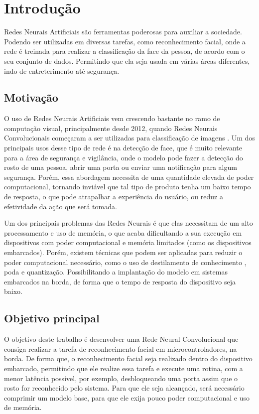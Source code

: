 \chapter{Introdução}

Redes Neurais Artificiais são ferramentas poderosas para auxiliar a sociedade.
Podendo ser utilizadas em diversas tarefas, como reconhecimento facial, onde a rede é treinada para realizar a
classificação da face da pessoa, de acordo com o seu conjunto de dados.
Permitindo que ela seja usada em várias áreas diferentes, indo de entreterimento até segurança.


\section{Motivação}
O uso de Redes Neurais Artificiais vem crescendo bastante no ramo de computação visual, principalmente desde 2012,
quando Redes Neurais Convolucionais começaram a ser utilizadas para classificação de imagens \cite{alexnet}.
Um dos principais usos desse tipo de rede é na detecção de face, que é muito relevante para a área de segurança e
vigilância, onde o modelo pode fazer a detecção do rosto de uma pessoa, abrir uma porta ou enviar uma notificação
para algum segurança. Porém, essa abordagem necessita de uma quantidade elevada de poder computacional, tornando
inviável que tal tipo de produto tenha um baixo tempo de resposta, o que pode atrapalhar a experiência do usuário, ou
reduz a efetividade da ação que será tomada.

Um dos principais problemas das Redes Neurais é que elas necessitam de um alto processamento e uso de memória, o que
acaba dificultando a sua execução em dispositivos com poder computacional e memória limitados (como os dispositivos
embarcados).
Porém, existem técnicas que podem ser aplicadas para reduzir o poder computacional necessário, como o uso de
destilamento de conhecimento \cite{hinton2015distilling}, poda e quantização.
Possibilitando a implantação do modelo em sistemas embarcados na borda, de forma que o tempo de resposta do dispositivo
seja baixo.

\section{Objetivo principal}

O objetivo deste trabalho é desenvolver uma Rede Neural Convolucional que consiga realizar a tarefa de reconhecimento
facial em microcontroladores, na borda.
De forma que, o reconhecimento facial seja realizado dentro do dispositivo embarcado, permitindo que ele realize essa
tarefa e execute uma rotina, com a menor latência possível, por exemplo, desbloqueando uma porta assim que o rosto for
reconhecido pelo sistema.
Para que ele seja alcançado, será necessário comprimir um modelo base, para que ele exija pouco poder computacional
e uso de memória.

